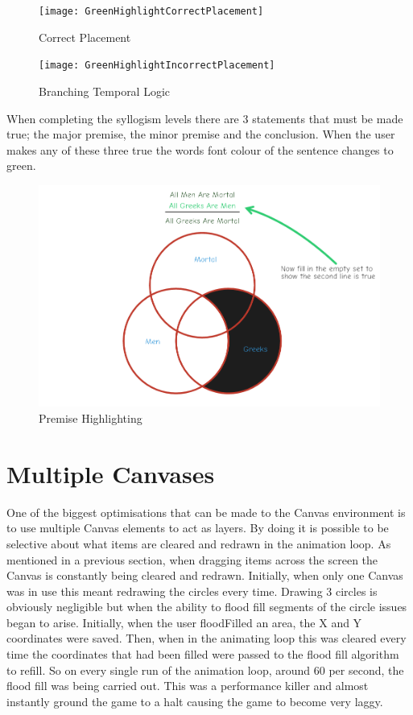 \documentclass[12pt,a4paper]{report}
\begin{document}
\begin{figure}[!h]
  \centering
  \begin{minipage}[b]{0.4\textwidth}
    \texttt{[image: GreenHighlightCorrectPlacement]}
    \caption{Correct Placement}
  \end{minipage}
  \hfill
  \begin{minipage}[b]{0.4\textwidth}
    \texttt{[image: GreenHighlightIncorrectPlacement]}
    \caption{Branching Temporal Logic}
  \end{minipage}
\end{figure}
\FloatBarrier

When completing the syllogism levels there are 3 statements that must be made true; the major premise, the minor premise and the conclusion. When the user makes any of these three true the words font colour of the sentence changes to green.


\begin{figure}[h]
\centering
    \includegraphics[scale=0.5]{PremiseHighlight}
    \caption{Premise Highlighting}
    \label{fig:floodFillBad}
\end{figure}
\FloatBarrier

\section{Multiple Canvases}
One of the biggest optimisations that can be made to the Canvas environment is to use multiple Canvas elements to act as layers. By doing it is possible to be selective about what items are cleared and redrawn in the animation loop. As mentioned in a previous section, when dragging items across the screen the Canvas is constantly being cleared and redrawn. Initially, when only one Canvas was in use this meant redrawing the circles every time. Drawing 3 circles is obviously negligible but when the ability to flood fill segments of the circle issues began to arise. Initially, when the user floodFilled an area, the X and Y coordinates were saved. Then, when in the animating loop this was cleared every time the coordinates that had been filled were passed to the flood fill algorithm to refill. So on every single run of the animation loop, around 60 per second, the flood fill was being carried out. This was a performance killer and almost instantly ground the game to a halt causing the game to become very laggy.
\end{document}
